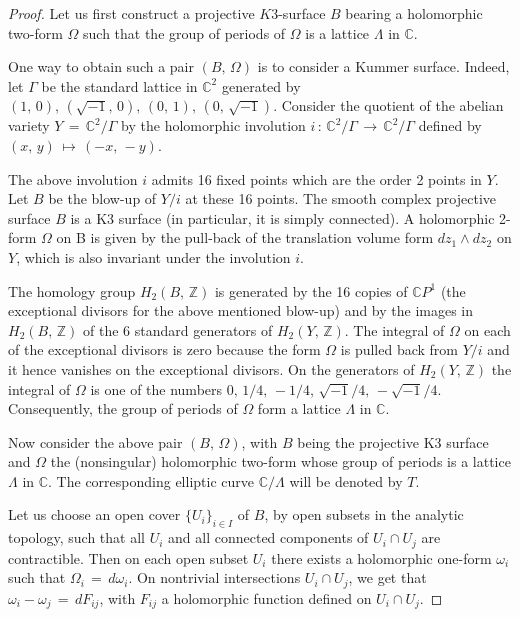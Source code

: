 \documentclass[10pt,a4paper]{amsart}
\begin{document}
\begin{proof}
Let us first construct a projective $K3$-surface $B$ bearing a holomorphic two-form $\Omega$ such that the
group of periods of $\Omega$ is a lattice $\Lambda$ in $\mathbb C$.

One way to obtain such a pair $(B, \,\Omega)$ is to consider a Kummer surface. Indeed, let $\Gamma$ be the 
standard lattice in $\mathbb{C}^2$ generated by $(1,\,0),\, (\sqrt{-1},\,0),\, (0,\,1),\, (0,\,\sqrt{-1})$. 
Consider the quotient of the abelian variety $Y\,=\,\mathbb {C}^2 / \Gamma$ by the holomorphic involution 
$i\,:\, \mathbb {C}^2 / \Gamma\, \longrightarrow\, \mathbb {C}^2 / \Gamma$ defined by $(x, \,y) 
\,\longmapsto\, (-x,\, -y)$.

The above involution $i$ admits 16 fixed points which are the order 2 points in $Y$. Let $B$ be the 
blow-up of $Y/i $ at these 16 points. The smooth complex projective surface $B$ is a K3 surface (in 
particular, it is simply connected). A holomorphic 2-form $\Omega$ on B is given by the 
pull-back of the translation volume form $dz_1\wedge dz_2$ on $Y$, which is also invariant under the 
involution $i$.

The homology group $H_2(B,\, \mathbb{Z})$ is generated by the 16 copies of ${\mathbb C}P^1$ (the 
exceptional divisors for the above mentioned blow-up) and by the images in $H_2(B,\, \mathbb{Z})$ of the 6 
standard generators of $H_2(Y, \,\mathbb{Z}).$ The integral of $\Omega$ on each of the exceptional divisors is zero 
because the form $\Omega$ is pulled back from $Y/i$ and it hence vanishes on the exceptional divisors. On the 
generators of $H_2(Y,\, \mathbb{Z})$ the integral of $\Omega$ is one of the numbers $0,\, 1/4,\, -1/4,\, 
\sqrt{-1}/4,\, -\sqrt{-1}/4.$ Consequently, the group of periods of $\Omega$ form a lattice $\Lambda$ in 
$\mathbb C$.

Now consider the above pair $(B,\, \Omega)$, with $B$ being the projective K3 surface and $\Omega$ the 
(nonsingular) holomorphic two-form whose group of periods is a lattice $\Lambda$ in $\mathbb C$. The 
corresponding elliptic curve $\mathbb{C}/\Lambda$ will be denoted by $T$.

Let us choose an open cover $\{U_i\}_{i \in I}$ of $B$, by open subsets in the analytic topology, such that 
all $U_i$ and all connected components of $U_i \cap U_j$ are contractible. Then on each open subset $U_i$ 
there exists a holomorphic one-form $\omega_i$ such that $\Omega_i\,=\,d \omega_i$. On nontrivial 
intersections $U_i \cap U_j$, we get that $\omega_i-\omega_j\,=\,dF_{ij}$, with $F_{ij}$ a holomorphic 
function defined on $U_i \cap U_j$.


\end{proof}
\end{document}
